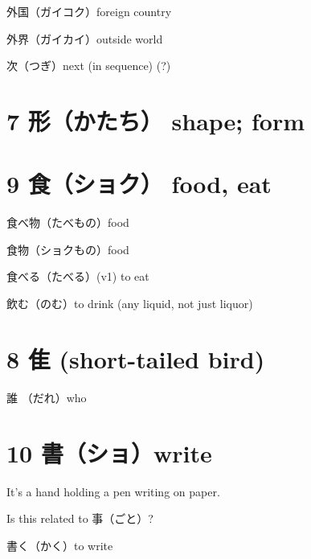 外国（ガイコク）foreign country

外界（ガイカイ）outside world

次（つぎ）next (in sequence) (?)

\section{7 形（かたち） shape; form}

\section{9 食（ショク） food, eat}

食べ物（たべもの）food

食物（ショクもの）food

食べる（たべる）(v1) to eat

飲む（のむ）to drink (any liquid, not just liquor)

\section{8 隹 (short-tailed bird)}

誰 （だれ）who

\section{10 書（ショ）write}

It's a hand holding a pen writing on paper.

Is this related to 事（ごと）?

書く（かく）to write
